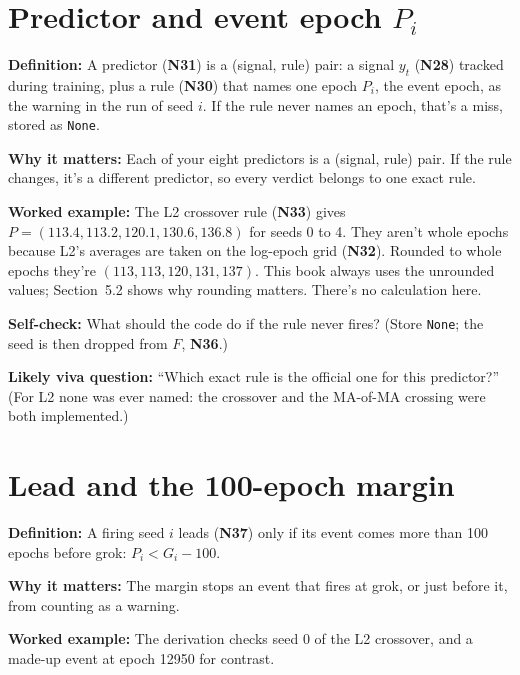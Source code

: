 \documentclass[11pt,a4paper,oneside,openany]{report}
\newcommand{\None}{\texttt{None}}
\newcommand{\gl}[1]{\textbf{#1}}   %
\newcommand{\fdef}{\textbf{Definition:} }
\newcommand{\fwhy}{\par\textbf{Why it matters:} }
\newcommand{\fex}{\par\textbf{Worked example:} }
\newcommand{\fself}{\par\textbf{Self-check:} }
\newcommand{\fviva}{\par\textbf{Likely viva question:} }
\begin{document}
\section{Predictor and event epoch $P_i$}
\fdef A predictor (\gl{N31}) is a (signal, rule) pair: a signal $y_t$ (\gl{N28}) tracked during training, plus a rule (\gl{N30}) that names one epoch $P_i$, the event epoch, as the warning in the run of seed $i$. If the rule never names an epoch, that's a miss, stored as \None.
\fwhy Each of your eight predictors is a (signal, rule) pair. If the rule changes, it's a different predictor, so every verdict belongs to one exact rule.
\fex The L2 crossover rule (\gl{N33}) gives $P = (113.4, 113.2, 120.1, 130.6, 136.8)$ for seeds 0 to 4. They aren't whole epochs because L2's averages are taken on the log-epoch grid (\gl{N32}). Rounded to whole epochs they're $(113, 113, 120, 131, 137)$. This book always uses the unrounded values; Section~5.2 shows why rounding matters. There's no calculation here.
\fself What should the code do if the rule never fires? (Store \None; the seed is then dropped from $F$, \gl{N36}.)
\fviva ``Which exact rule is the official one for this predictor?'' (For L2 none was ever named: the crossover and the MA-of-MA crossing were both implemented.)

\section{Lead and the 100-epoch margin}
\fdef A firing seed $i$ leads (\gl{N37}) only if its event comes more than 100 epochs before grok: $P_i < G_i - 100$.
\fwhy The margin stops an event that fires at grok, or just before it, from counting as a warning.
\fex The derivation checks seed 0 of the L2 crossover, and a made-up event at epoch 12950 for contrast.
\end{document}
